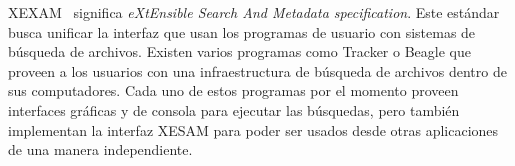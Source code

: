 XEXAM~\cite{xesam:website} significa \textit{eXtEnsible Search And Metadata specification}. Este estándar busca unificar la interfaz que usan los programas de usuario con sistemas de búsqueda de archivos. Existen varios programas como Tracker o Beagle que proveen a los usuarios con una infraestructura de búsqueda de archivos dentro de sus computadores. Cada uno de estos programas por el momento proveen interfaces gráficas y de consola para ejecutar las búsquedas, pero también implementan la interfaz XESAM para poder ser usados desde otras aplicaciones de una manera independiente.



